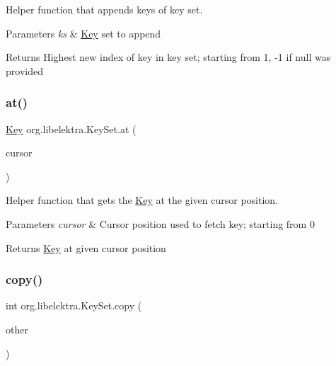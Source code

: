 Helper function that appends keys of key set. 


\begin{DoxyParams}{Parameters}
{\em ks} & \mbox{\hyperlink{classorg_1_1libelektra_1_1Key}{Key}} set to append \\
\hline
\end{DoxyParams}
\begin{DoxyReturn}{Returns}
Highest new index of key in key set; starting from 1, -\/1 if null was provided 
\end{DoxyReturn}
\mbox{\label{classorg_1_1libelektra_1_1KeySet_a125d86734bd428c9eb1f937eb1b7ab74}} 
\subsubsection{\texorpdfstring{at()}{at()}}
{\footnotesize\ttfamily \mbox{\hyperlink{classorg_1_1libelektra_1_1Key}{Key}} org.\+libelektra.\+Key\+Set.\+at (\begin{DoxyParamCaption}\item[{final int}]{cursor }\end{DoxyParamCaption})\hspace{0.3cm}{\ttfamily [inline]}}



Helper function that gets the \mbox{\hyperlink{classorg_1_1libelektra_1_1Key}{Key}} at the given cursor position. 


\begin{DoxyParams}{Parameters}
{\em cursor} & Cursor position used to fetch key; starting from 0 \\
\hline
\end{DoxyParams}
\begin{DoxyReturn}{Returns}
\mbox{\hyperlink{classorg_1_1libelektra_1_1Key}{Key}} at given cursor position 
\end{DoxyReturn}
\mbox{\label{classorg_1_1libelektra_1_1KeySet_a32cba0dbe638373296fb242a698ad1cb}} 
\subsubsection{\texorpdfstring{copy()}{copy()}}
{\footnotesize\ttfamily int org.\+libelektra.\+Key\+Set.\+copy (\begin{DoxyParamCaption}\item[{final \mbox{\hyperlink{classorg_1_1libelektra_1_1KeySet}{Key\+Set}}}]{other }\end{DoxyParamCaption})\hspace{0.3cm}{\ttfamily [inline]}}



